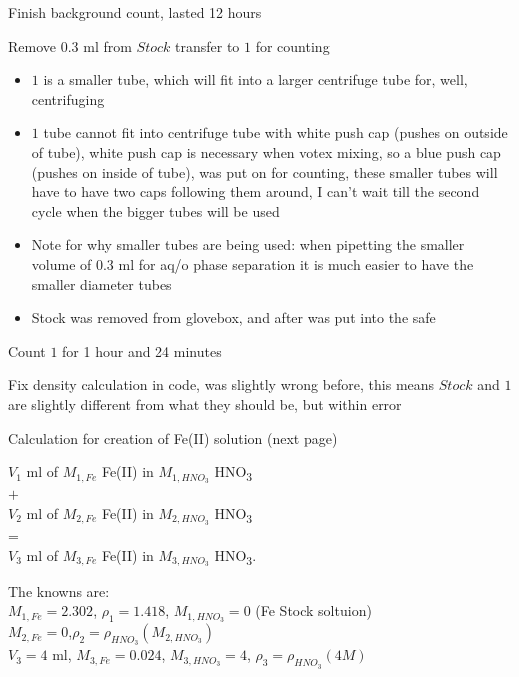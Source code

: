 \documentclass[idxtotoc,hyperref,openany,oneside]{labbook} %
\newcommand{\cmark}{\ding{51}}%
\newcommand{\done}{\rlap{$\square$}{\raisebox{2pt}{\large\hspace{1pt}\cmark}}%
  \hspace{-2.5pt}}
\newcommand{\tsbs}{\textsubscript}
\begin{document}
\begin{todolist}
\item[\done]{Finish background count, lasted 12 hours}
\item[\done]{Remove 0.3 ml from $\boxed{Stock}$ transfer to $\boxed{1}$
  for counting}
  \begin{itemize}
  \item{$\boxed{1}$ is a smaller tube, which will fit into a larger
    centrifuge tube for, well, centrifuging}
  \item{$\boxed{1}$ tube cannot fit into centrifuge tube with white
    push cap (pushes on outside of tube),
    white push cap is necessary when votex mixing, so a blue push cap
    (pushes on inside of tube), was put on for counting, these smaller
    tubes will have to have two caps following them around, I can't
    wait till the second cycle when the bigger tubes will be used}
  \item{Note for why smaller tubes are being used: when pipetting the
    smaller volume of 0.3 ml for aq/o phase separation it is much
    easier to have the smaller diameter tubes}
  \item{Stock was removed from glovebox, and after was put into the safe}
  \end{itemize}
\item[\done]{Count $\boxed{1}$ for 1 hour and 24 minutes}
\item[\done]{Fix density calculation in code, was slightly wrong before,
  this means $\boxed{Stock}$ and $\boxed{1}$ are slightly different
  from what they should be, but within error}
\item[\done]{Calculation for creation of Fe(II) solution (next page)}
\end{todolist}
\clearpage
\begin{center}
  $V_1$ ml of $M_{1,Fe}$ Fe(II) in $M_{1,HNO_3}$ HNO\tsbs{3}\\
  $+$\\
  $V_2$ ml of $M_{2,Fe}$ Fe(II) in $M_{2,HNO_3}$ HNO\tsbs{3}\\
  =\\
$V_3$ ml of $M_{3,Fe}$ Fe(II) in $M_{3,HNO_3}$ HNO\tsbs{3}.
\end{center}

The knowns are: \\
$M_{1,Fe}=2.302$, $\rho_1=1.418$, $M_{1,HNO_3}=0$ (Fe Stock soltuion)\\
$M_{2,Fe}=0$,$\rho_2=\rho_{HNO_3}(M_{2,HNO_3})$ \\
$V_3=4$ ml, $M_{3,Fe}=0.024$, $M_{3,HNO_3}=4$, $\rho_3=\rho_{HNO_3}(4M)$\\~\\
\end{document}
